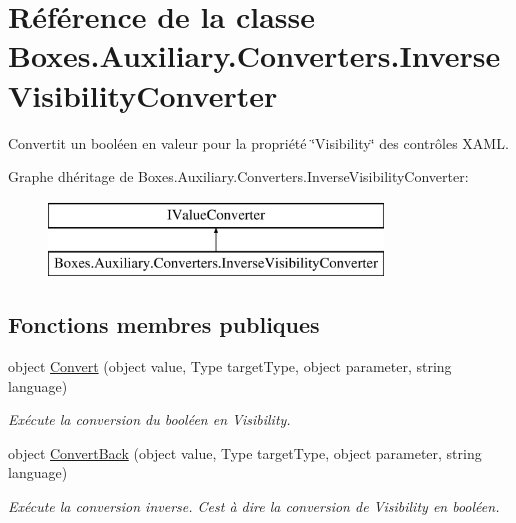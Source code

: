 \hypertarget{class_boxes_1_1_auxiliary_1_1_converters_1_1_inverse_visibility_converter}{}\section{Référence de la classe Boxes.\+Auxiliary.\+Converters.\+Inverse\+Visibility\+Converter}
\label{class_boxes_1_1_auxiliary_1_1_converters_1_1_inverse_visibility_converter}


Convertit un booléen en valeur pour la propriété \char`\"{}\+Visibility\char`\"{} des contrôles X\+A\+ML.  


Graphe d\textquotesingle{}héritage de Boxes.\+Auxiliary.\+Converters.\+Inverse\+Visibility\+Converter\+:\begin{figure}[H]
\begin{center}
\leavevmode
\includegraphics[height=2.000000cm]{class_boxes_1_1_auxiliary_1_1_converters_1_1_inverse_visibility_converter}
\end{center}
\end{figure}
\subsection*{Fonctions membres publiques}
\begin{DoxyCompactItemize}
\item 
object \hyperlink{class_boxes_1_1_auxiliary_1_1_converters_1_1_inverse_visibility_converter_ac80d33b45483c2190b8dcde2b6f715d2}{Convert} (object value, Type target\+Type, object parameter, string language)
\begin{DoxyCompactList}\small\item\em Exécute la conversion du booléen en Visibility. \end{DoxyCompactList}\item 
object \hyperlink{class_boxes_1_1_auxiliary_1_1_converters_1_1_inverse_visibility_converter_aa448bfdc1f53c3a3ee4cd63a886c10e3}{Convert\+Back} (object value, Type target\+Type, object parameter, string language)
\begin{DoxyCompactList}\small\item\em Exécute la conversion inverse. C\textquotesingle{}est à dire la conversion de Visibility en booléen. \end{DoxyCompactList}\end{DoxyCompactItemize}


